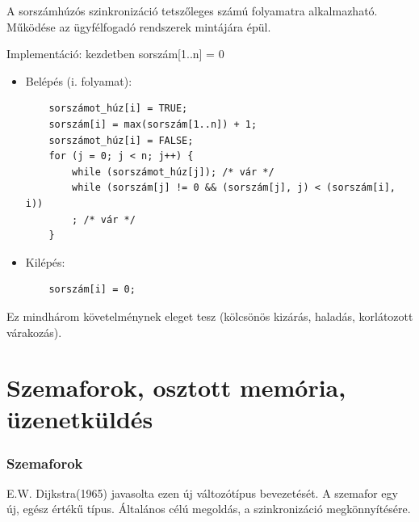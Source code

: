 \documentclass[tikz,12pt,margin=0px]{article}
\begin{document}
    A  sorszámhúzós szinkronizáció tetszőleges számú folyamatra alkalmazható. Működése az ügyfélfogadó rendszerek mintájára épül.

    \noindent Implementáció: kezdetben sorszám[1..n] = 0
        \begin{itemize}[topsep=8pt,itemsep=4pt,partopsep=4pt, parsep=4pt]
            \item Belépés (i. folyamat):
            \begin{verbatim}
    sorszámot_húz[i] = TRUE;
    sorszám[i] = max(sorszám[1..n]) + 1;
    sorszámot_húz[i] = FALSE;
    for (j = 0; j < n; j++) {
        while (sorszámot_húz[j]); /* vár */
        while (sorszám[j] != 0 && (sorszám[j], j) < (sorszám[i], i))
        ; /* vár */
    }
        \end{verbatim}
            \item Kilépés:
            \begin{verbatim}
    sorszám[i] = 0;
            \end{verbatim}
        \end{itemize}

    \noindent Ez mindhárom követelménynek eleget tesz (kölcsönös kizárás, haladás, korlátozott várakozás).

	\section*{Szemaforok, osztott memória, üzenetküldés}
	
    \subsubsection*{Szemaforok}

    E.W. Dijkstra(1965) javasolta ezen új változótípus bevezetését. A szemafor egy új, egész értékű típus. Általános célú megoldás, a szinkronizáció megkönnyítésére.
\end{document}
